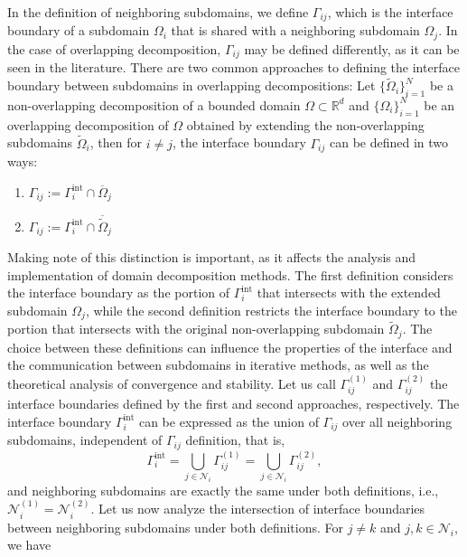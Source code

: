 In the definition of neighboring subdomains, we define $\Gamma_{ij}$, which is the interface boundary of a subdomain $\Omega_i$ that is shared with a neighboring 
subdomain $\Omega_j$. In the case of overlapping decomposition, $\Gamma_{ij}$ may be defined differently, as it can be seen in the literature. There are two common 
approaches to defining the interface boundary between subdomains in overlapping decompositions: Let $\{\widetilde{\Omega}_i\}_{i=1}^N$ be a non-overlapping decomposition of a bounded 
domain $\Omega \subset \mathbb{R}^d$ and $\{\Omega_i\}_{i=1}^N$ be an overlapping decomposition of $\Omega$ obtained by extending the non-overlapping subdomains 
$\widetilde{\Omega}_i$, then for $i \neq j$, the interface boundary $\Gamma_{ij}$ can be defined in two ways:
\begin{enumerate}[label=(\arabic*)]
    \item $\Gamma_{ij} := \Gamma_{i}^{\text{int}} \cap \overline{\Omega}_j$
    \item $\Gamma_{ij} := \Gamma_{i}^{\text{int}} \cap \overline{\widetilde{\Omega}}_j$
\end{enumerate}
Making note of this distinction is important, as it affects the analysis and implementation of domain decomposition methods. The first definition considers the 
interface boundary as the portion of $\Gamma_i^{\text{int}}$ that intersects with the extended subdomain $\Omega_j$, while the second definition restricts the 
interface boundary to the portion that intersects with the original non-overlapping subdomain $\widetilde{\Omega}_j$. The choice between these definitions can 
influence the properties of the interface and the communication between subdomains in iterative methods, as well as the theoretical analysis of convergence and 
stability. Let us call $\Gamma_{ij}^{(1)}$ and $\Gamma_{ij}^{(2)}$ the interface boundaries defined by the first and second approaches, respectively. The interface 
boundary $\Gamma_i^{\text{int}}$ can be expressed as the union of $\Gamma_{ij}$ over all neighboring subdomains, independent of $\Gamma_{ij}$ definition, that is,
\begin{equation*}
    \Gamma_i^{\text{int}} = \bigcup_{j \in \mathcal{N}_i} \Gamma_{ij}^{(1)} = \bigcup_{j \in \mathcal{N}_i} \Gamma_{ij}^{(2)},
\end{equation*}  
and neighboring subdomains are exactly the same under both definitions, i.e., $\mathcal{N}_i^{(1)} = \mathcal{N}_i^{(2)}$. Let us now analyze the intersection 
of interface boundaries between neighboring subdomains under both definitions. For $j \neq k$ and $j, k \in \mathcal{N}_i$, we have
